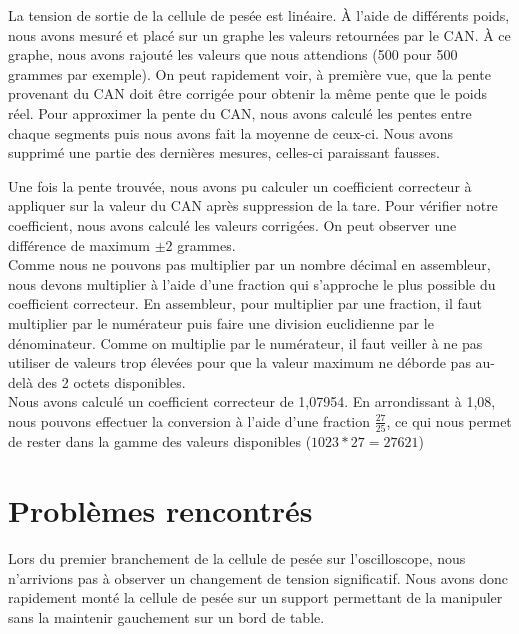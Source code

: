\documentclass[a4paper,11pt,titlepage]{article}
\begin{document}
La tension de sortie de la cellule de pesée est linéaire. À l'aide de différents poids, nous avons mesuré et placé sur un graphe les valeurs retournées par le CAN. À ce graphe, nous avons rajouté les valeurs que nous attendions (500 pour 500 grammes par exemple). On peut rapidement voir, à première vue, que la pente provenant du CAN doit être corrigée pour obtenir la même pente que le poids réel. Pour approximer la pente du CAN, nous avons calculé les pentes entre chaque segments puis nous avons fait la moyenne de ceux-ci. Nous avons supprimé une partie des dernières mesures, celles-ci paraissant fausses.\\


Une fois la pente trouvée, nous avons pu calculer un coefficient correcteur à appliquer sur la valeur du CAN après suppression de la tare. Pour vérifier notre coefficient, nous avons calculé les valeurs corrigées. On peut observer une différence de maximum $\pm{2}$ grammes.\\

Comme nous ne pouvons pas multiplier par un nombre décimal en assembleur, nous devons multiplier à l'aide d'une fraction qui s'approche le plus possible du coefficient correcteur. En assembleur, pour multiplier par une fraction, il faut multiplier par le numérateur puis faire une division euclidienne par le dénominateur. Comme on multiplie par le numérateur, il faut veiller à ne pas utiliser de valeurs trop élevées pour que la valeur maximum ne déborde pas au-delà des 2 octets disponibles.\\

Nous avons calculé un coefficient correcteur de 1,07954. En arrondissant à 1,08, nous pouvons effectuer la conversion à l'aide d'une fraction $\frac{27}{25}$, ce qui nous permet de rester dans la gamme des valeurs disponibles ($1023 * 27 = 27621$)\\

\section{Problèmes rencontrés}

Lors du premier branchement de la cellule de pesée sur l'oscilloscope, nous n'arrivions pas à observer un changement de tension significatif. Nous avons donc rapidement monté la cellule de pesée sur un support permettant de la manipuler sans la maintenir gauchement sur un bord de table.\\
\end{document}
